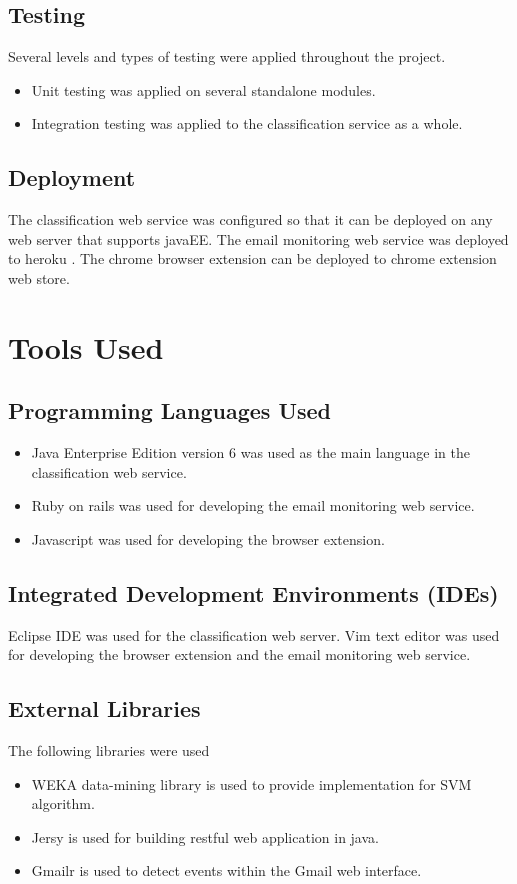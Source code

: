 \subsection{Testing}
Several levels and types of testing were applied throughout the project.
\begin{itemize}
  \item Unit testing was applied on several standalone modules.
  \item Integration testing was applied to the classification service as a whole.
\end{itemize}

\subsection{Deployment}
The classification web service was configured so that it can be deployed on any 
web server that supports javaEE. The email monitoring web service was deployed 
to heroku \cite{HEROKU}. The chrome browser extension can be deployed to chrome 
extension web store.

\section{Tools Used}
\label{sec:5_tools_used}

\subsection{Programming Languages Used}
\begin{itemize}
  \item Java Enterprise Edition version 6 was used as the main language in the 
  classification web service.
  \item Ruby on rails \cite{ROR} was used for developing the email monitoring 
  web service.
  \item Javascript was used for developing the browser extension.
\end{itemize}

\subsection{Integrated Development Environments (IDEs)}
Eclipse IDE was used for the classification web server.
Vim text editor was used for developing the browser extension and the email 
monitoring web service.

\subsection{External Libraries}
The following libraries were used
\begin{itemize}
  \item WEKA \cite{WEKA} data-mining library is used to provide implementation for SVM algorithm.
  \item Jersy \cite{JERSY} is used for building restful web application in java.
  \item Gmailr \cite{GMAILR} is used to detect events within the Gmail web interface.
\end{itemize}


